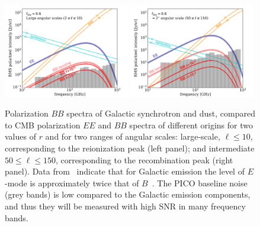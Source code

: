 \documentclass[PICOReport.tex]{subfiles}
\begin{document}
\begin{figure}[ht]
\includegraphics[width=0.49\textwidth]{images/sensitivity_vs_frequency_Jan3_2019_large_scale_v2.pdf}
\includegraphics[width=0.49\textwidth]{images/sensitivity_vs_frequency_Jan3_2019_2deg_scale_v2.pdf}
\vspace{-0.1in}
\caption{\captiontext
Polarization $BB$ spectra of Galactic synchrotron and dust, compared to CMB polarization $EE$ and $BB$ spectra of different origins for two values of $r$ and for two ranges of angular scales: large-scale, $\ell \leq 10$, corresponding to the reionization peak (left panel); and intermediate $50 \leq \ell \leq 150$, corresponding to the recombination peak (right panel). 
Data from \planck\ indicate that for Galactic emission the level of $E$-mode is approximately twice that of $B$~\cite{planckEB}.
The PICO baseline noise (grey bands) is low compared to the Galactic emission components, and thus they will be measured with high \ac{SNR} in many frequency bands.
\label{fig:pico-channels-and-fg} }
\vspace{-0.1in}
\end{figure}
\end{document}
